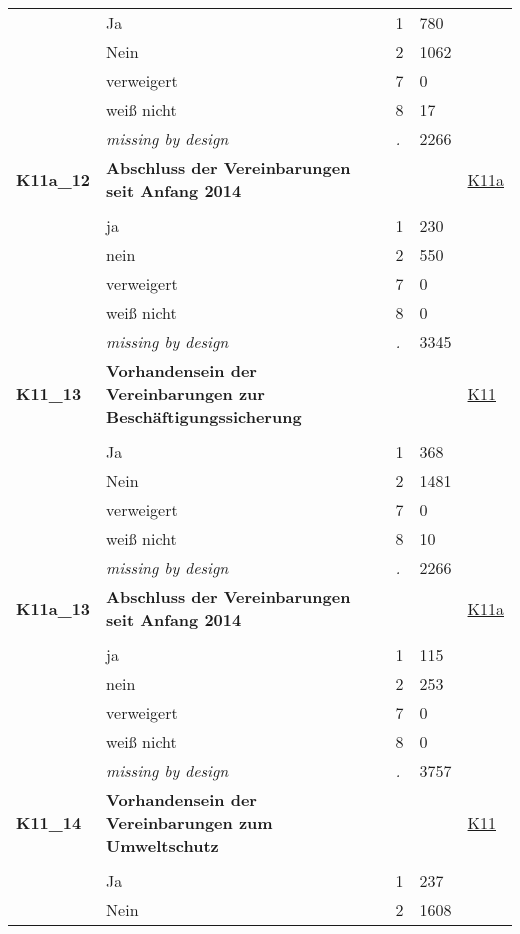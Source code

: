 \begin{longtable}{| L{2.65cm} | L{8cm} | C{1.5cm} | R{1.25cm} | C{2.25cm}  |}
   & Ja & 1 & 780 &  \\ 
   & Nein & 2 & 1062 &  \\ 
   & verweigert & 7 & 0 &  \\ 
   & weiß nicht & 8 & 17 &  \\ 
   & \textit{missing by design} & \textit{.} & 2266 &  \\ 
   \midrule
\textbf{K11a\_12}\label{var:K11a:12} & \textbf{Abschluss der Vereinbarungen seit Anfang 2014} &  &  & \hyperref[K11a]{K11a} \\ 
   &  &  &  &  \\ 
   & ja & 1 & 230 &  \\ 
   & nein & 2 & 550 &  \\ 
   & verweigert & 7 & 0 &  \\ 
   & weiß nicht & 8 & 0 &  \\ 
   & \textit{missing by design} & \textit{.} & 3345 &  \\ 
   \midrule
\textbf{K11\_13}\label{var:K11:13} & \textbf{Vorhandensein der Vereinbarungen zur Beschäftigungssicherung} &  &  & \hyperref[K11]{K11} \\ 
   &  &  &  &  \\ 
   & Ja & 1 & 368 &  \\ 
   & Nein & 2 & 1481 &  \\ 
   & verweigert & 7 & 0 &  \\ 
   & weiß nicht & 8 & 10 &  \\ 
   & \textit{missing by design} & \textit{.} & 2266 &  \\ 
   \midrule
\textbf{K11a\_13}\label{var:K11a:13} & \textbf{Abschluss der Vereinbarungen seit Anfang 2014} &  &  & \hyperref[K11a]{K11a} \\ 
   &  &  &  &  \\ 
   & ja & 1 & 115 &  \\ 
   & nein & 2 & 253 &  \\ 
   & verweigert & 7 & 0 &  \\ 
   & weiß nicht & 8 & 0 &  \\ 
   & \textit{missing by design} & \textit{.} & 3757 &  \\ 
   \midrule
\textbf{K11\_14}\label{var:K11:14} & \textbf{Vorhandensein der Vereinbarungen zum Umweltschutz} &  &  & \hyperref[K11]{K11} \\ 
   &  &  &  &  \\ 
   & Ja & 1 & 237 &  \\ 
   & Nein & 2 & 1608 &  \\ 

\end{longtable}
